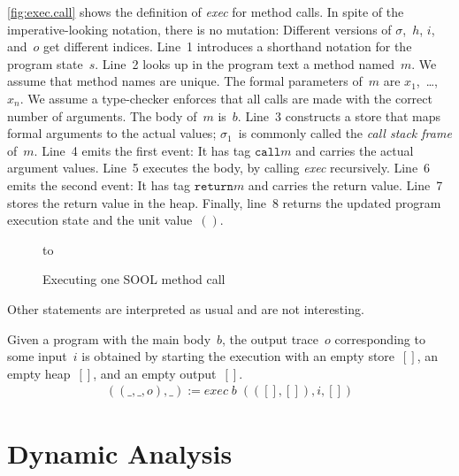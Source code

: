 \documentclass[preprint]{sigplanconf} %
\theoremstyle{definition}
\theoremstyle{remark}
\begin{document}
\autoref{fig:exec.call} shows the definition of \textit{exec} for method calls.
In spite of the imperative-looking notation, there is no mutation:
Different versions of $\sigma$,~$h$, $i$, and~$o$ get different indices.
Line~1 introduces a shorthand notation for the program state~$s$.
Line~2 looks up in the program text a method named~$m$.
We assume that method names are unique.
The formal parameters of~$m$ are $x_1$,~\dots,~$x_n$.
We assume a type-checker enforces that all calls are made with the correct number of arguments.
The body of~$m$ is~$b$.
Line~3 constructs a store that maps formal arguments to the actual values;
$\sigma_1$~is commonly called the \emph{call stack frame} of~$m$.
Line~4 emits the first event:
It has tag $\mathtt{call}m$ and carries the actual argument values.
Line~5 executes the body, by calling \textit{exec} recursively.
Line~6 emits the second event:
It has tag $\mathtt{return}m$ and carries the return value.
Line~7 stores the return value in the heap.
Finally, line~8 returns the updated program execution state and the unit value~$()$.

\begin{figure}
\hbox to
\caption{Executing one SOOL method call}
\label{fig:exec.call}
\end{figure}

Other statements are interpreted as usual and are not interesting.

Given a program with the main body~$b$, the output trace~$o$ corresponding to some input~$i$ is obtained by starting the execution with an empty store~$[]$, an empty heap~$[]$, and an empty output~$[]$.
\begin{align}
((\_,\_,o),\_):=\mathit{exec}\;b\;(([],[]),i,[])
\end{align}

\section{Dynamic Analysis}\label{sec:dynamic} %
\end{document}
